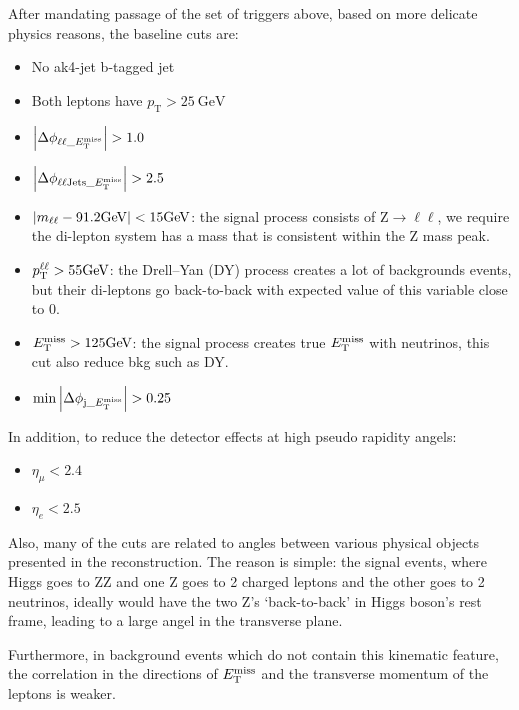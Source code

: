 After mandating passage of the set of triggers above, based on more delicate physics reasons, 
the baseline cuts are:
\begin{itemize}
    \item No ak4-jet b-tagged jet
    \item Both leptons have $p_\mathrm{T} > \SI{25}{\giga\electronvolt}$
    \item $\abs{\Delta\phi_{\ell\ell\_E_{\mathrm{T}}^{\mathrm{miss}}}} > 1.0$
    \item $\abs{\Delta\phi_{\ell\ell\mathrm{Jets}\_E_{\mathrm{T}}^{\mathrm{miss}}}} > 2.5$
    \item $\abs{m_{\ell\ell} - 91.2\si{\giga\electronvolt}} < 15\si{\giga\electronvolt}$:
        the signal process consists of $\mathrm{Z}\rightarrow{}\ell\ell$, we
        require the di-lepton system has a mass that is consistent within the Z mass peak.
    \item $p_\mathrm{T}^{\ell\ell} > 55\si{\giga\electronvolt}$: 
        the Drell–Yan (DY) process creates a lot of backgrounds events, but their di-leptons
        go back-to-back with expected value of this variable close to 0.
    \item $E_{\mathrm{T}}^{\mathrm{miss}} > 125\si{\giga\electronvolt}$:
        the signal process creates true $E_{\mathrm{T}}^{\mathrm{miss}}$ with neutrinos, this cut also reduce bkg such
        as DY.
    \item $\min{\abs{ \Delta\phi_{\mathrm{j}\_E_{\mathrm{T}}^{\mathrm{miss}}}}} > 0.25$
\end{itemize}
In addition, to reduce the detector effects at high pseudo rapidity angels:
\begin{itemize}
    \item $\eta_\mu< 2.4$
    \item $\eta_e< 2.5$
\end{itemize}

 Also, many of the cuts are related to angles between various physical objects presented in the
reconstruction. The reason is simple: the signal events, where Higgs goes to ZZ and one Z
goes to 2 charged leptons and the other goes to 2 neutrinos, ideally would have the two Z's 
`back-to-back' in Higgs boson's rest frame, leading to a large angel in the transverse plane.

Furthermore, in background events which do not contain this kinematic feature, the
correlation in the directions of $E_{\mathrm{T}}^{\mathrm{miss}}$ and the transverse momentum of the leptons is weaker.

